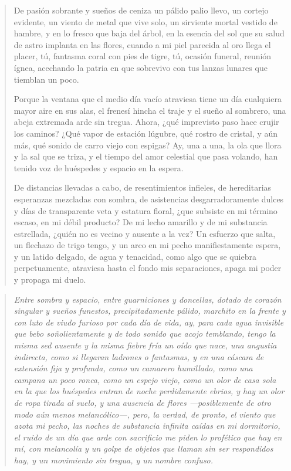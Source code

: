 \documentclass[12pt]{article}
\begin{document}
\clearpage
{}
\begin{verse}
De pasión sobrante y sueños de ceniza  
un pálido palio llevo, un cortejo evidente,  
un viento de metal que vive solo,  
un sirviente mortal vestido de hambre,  
y en lo fresco que baja del árbol, en la esencia del sol  
que su salud de astro implanta en las flores,  
cuando a mi piel parecida al oro llega el placer,  
tú, fantasma coral con pies de tigre,  
tú, ocasión funeral, reunión ígnea,  
acechando la patria en que sobrevivo  
con tus lanzas lunares que tiemblan un poco.  
	
Porque la ventana que el medio día vacío atraviesa  
tiene un día cualquiera mayor aire en sus alas,  
el frenesí hincha el traje y el sueño al sombrero,  
una abeja extremada arde sin tregua.  
Ahora, ¿qué imprevisto paso hace crujir los caminos?  
¿Qué vapor de estación lúgubre, qué rostro de cristal,  
y aún más, qué sonido de carro viejo con espigas?  
Ay, una a una, la ola que llora y la sal que se triza,  
y el tiempo del amor celestial que pasa volando,  
han tenido voz de huéspedes y espacio en la espera.  
	
De distancias llevadas a cabo, de resentimientos infieles,  
de hereditarias esperanzas mezcladas con sombra,  
de asistencias desgarradoramente dulces  
y días de transparente veta y estatura floral,  
¿que subsiste en mi término escaso, en mi débil producto?  
De mi lecho amarillo y de mi substancia estrellada,  
¿quién no es vecino y ausente a la vez?  
Un esfuerzo que salta, un flechazo de trigo  
tengo, y un arco en mi pecho manifiestamente espera,  
y un latido delgado, de agua y tenacidad,  
como algo que se quiebra perpetuamente,  
atraviesa hasta el fondo mis separaciones,  
apaga mi poder y propaga mi duelo.

\end{verse}

\clearpage
{}
\begin{verse}
\itshape
Entre sombra y espacio, entre guarniciones y doncellas,  
dotado de corazón singular y sueños funestos,  
precipitadamente pálido, marchito en la frente  
y con luto de viudo furioso por cada día de vida,  
ay, para cada agua invisible que bebo soñolientamente  
y de todo sonido que acojo temblando,  
tengo la misma sed ausente y la misma fiebre fría  
un oído que nace, una angustia indirecta,  
como si llegaran ladrones o fantasmas,  
y en una cáscara de extensión fija y profunda,  
como un camarero humillado, como una campana un poco ronca,  
como un espejo viejo, como un olor de casa sola  
en la que los huéspedes entran de noche perdidamente ebrios,  
y hay un olor de ropa tirada al suelo, y una ausencia de flores  
—posiblemente de otro modo aún menos melancólico—,  
pero, la verdad, de pronto, el viento que azota mi pecho,  
las noches de substancia infinita caídas en mi dormitorio,  
el ruido de un día que arde con sacrificio  
me piden lo profético que hay en mí, con melancolía  
y un golpe de objetos que llaman sin ser respondidos  
hay, y un movimiento sin tregua, y un nombre confuso.

\end{verse}
\end{document}
